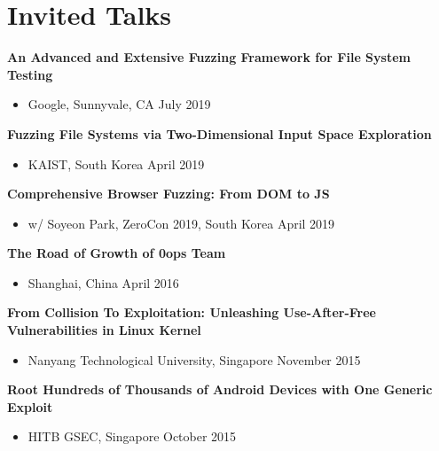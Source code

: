\section*{Invited Talks}
\begin{description}

    \item \textbf{An Advanced and Extensive Fuzzing Framework for File System Testing}
        \begin{itemize}
            \item Google, Sunnyvale, CA \dotfill July 2019
        \end{itemize}

    \item \textbf{Fuzzing File Systems via Two-Dimensional Input Space Exploration}
        \begin{itemize}
            \item KAIST, South Korea \dotfill April 2019
        \end{itemize}

	\item \textbf{Comprehensive Browser Fuzzing: From DOM to JS}
      \begin{itemize}
          \item w/ Soyeon Park, ZeroCon 2019, South Korea \dotfill April 2019
      \end{itemize}

	\item \textbf{The Road of Growth of 0ops Team}
      \begin{itemize}
          \item Shanghai, China \dotfill April 2016
      \end{itemize}

	\item \textbf{From Collision To Exploitation: Unleashing Use-After-Free Vulnerabilities in Linux Kernel}
		\begin{itemize}
			\item Nanyang Technological University, Singapore \dotfill November 2015
		\end{itemize}

  \item \textbf{Root Hundreds of Thousands of Android Devices with One Generic Exploit}
    \begin{itemize}
      \item HITB GSEC, Singapore \dotfill October 2015
    \end{itemize}

\end{description}
